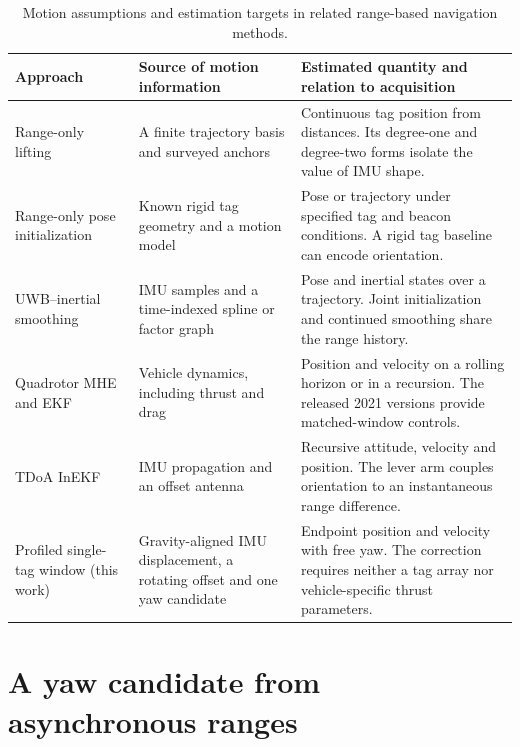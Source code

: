 \documentclass{IEEEtaes}
\begin{document}
\begin{table}[t]
\centering\caption{Motion assumptions and estimation targets in related range-based navigation methods.}
\label{tab:landscape}\tablefont
\begin{tabular*}{\textwidth}{@{\extracolsep{\fill}}p{}p{}p{}@{}}
\toprule
Approach&Source of motion information&Estimated quantity and relation to acquisition\\\midrule
Range-only lifting~\cite{pacholska}&A finite trajectory basis and surveyed anchors&Continuous tag position from distances. Its degree-one and degree-two forms isolate the value of IMU shape.\\
Range-only pose initialization~\cite{goudar}&Known rigid tag geometry and a motion model&Pose or trajectory under specified tag and beacon conditions. A rigid tag baseline can encode orientation.\\
UWB--inertial smoothing~\cite{sfuise,jiang}&IMU samples and a time-indexed spline or factor graph&Pose and inertial states over a trajectory. Joint initialization and continued smoothing share the range history.\\
Quadrotor MHE and EKF~\cite{pfeiffer,pfeiffer25}&Vehicle dynamics, including thrust and drag&Position and velocity on a rolling horizon or in a recursion. The released 2021 versions provide matched-window controls.\\
TDoA InEKF~\cite{oursland}&IMU propagation and an offset antenna&Recursive attitude, velocity and position. The lever arm couples orientation to an instantaneous range difference.\\
Profiled single-tag window (this work)&Gravity-aligned IMU displacement, a rotating offset and one yaw candidate&Endpoint position and velocity with free yaw. The correction requires neither a tag array nor vehicle-specific thrust parameters.\\
\bottomrule
\end{tabular*}
\end{table}

\section{A yaw candidate from asynchronous ranges}\label{sec:profile}
\end{document}
